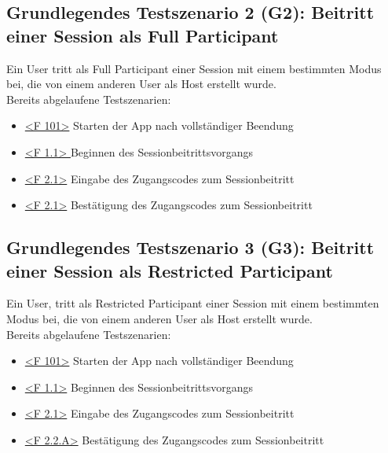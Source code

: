 \documentclass[oneside, ngerman]{sdqtechreport}
\begin{document}
\subsection{Grundlegendes Testszenario 2 (G2): Beitritt einer Session als Full Participant}
\label{subsec:Tests:GrundlegendeTestszenarien:G2}
\hypertarget{G2}{}
\newcommand{\gTwo}{\hyperlink{G2}{G2: Beitritt einer Session als Full Participant }}
Ein User tritt als Full Participant einer Session mit einem bestimmten Modus bei, die von einem anderen User als Host erstellt wurde. \\
Bereits abgelaufene Testszenarien: \gOne
\begin{itemize}
    \item \hyperlink{<F 101>}{<F 101>} Starten der App nach vollständiger Beendung
    \item \hyperlink{<F 1.1>}{<F 1.1> } Beginnen des Sessionbeitrittsvorgangs
    \item \hyperlink{<F 2.1>}{<F 2.1>} Eingabe des Zugangscodes zum Sessionbeitritt
    \item \hyperlink{<F 2.1>}{<F 2.1>} Bestätigung des Zugangscodes zum Sessionbeitritt
\end{itemize}


\subsection{Grundlegendes Testszenario 3 (G3): Beitritt einer Session als Restricted Participant}
\label{subsec:Tests:GrundlegendeTestszenarien:G3}
\hypertarget{G3}{}
\newcommand{\gThree}{\hyperlink{G3}{G3: Beitritt einer Session als Restricted Participant }}
Ein User, tritt als Restricted Participant einer Session mit einem bestimmten Modus bei, die von einem anderen User als Host erstellt wurde. \\
Bereits abgelaufene Testszenarien: \gOne
\begin{itemize}
    \item \hyperlink{<F 101>}{<F 101>} Starten der App nach vollständiger Beendung
    \item \hyperlink{<F 1.1>}{<F 1.1>} Beginnen des Sessionbeitrittsvorgangs
    \item \hyperlink{<F 2.1>}{<F 2.1>} Eingabe des Zugangscodes zum Sessionbeitritt
    \item \hyperlink{<F 2.2.A>}{<F 2.2.A>} Bestätigung des Zugangscodes zum Sessionbeitritt
\end{itemize}
\end{document}
